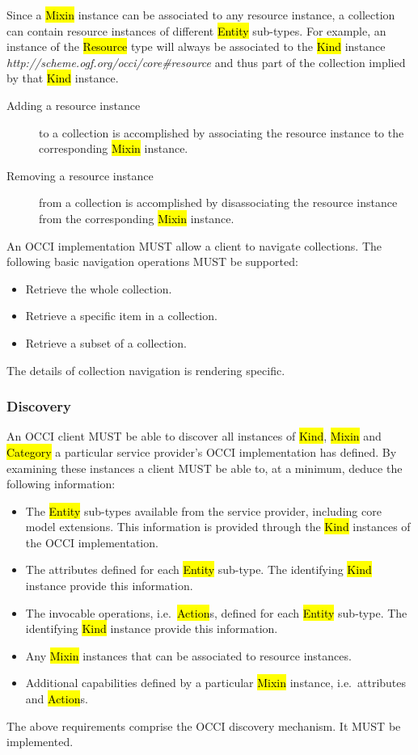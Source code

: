\documentclass[10pt,a4paper]{article}
\begin{document}
Since a \hl{Mixin} instance can be associated to any resource
instance, a collection can contain resource instances of different
\hl{Entity} sub-types.
For example, an instance of the \hl{Resource} type will always be
associated to the \hl{Kind} instance
\textit{http://scheme.ogf.org/occi/core\#resource} and thus part of
the collection implied by that \hl{Kind} instance.
%
\begin{description}
  \item[Adding a resource instance] to a collection is accomplished by
    associating the resource instance to the corresponding \hl{Mixin}
    instance.
  \item[Removing a resource instance] from a collection is
    accomplished by disassociating the resource instance from the
    corresponding \hl{Mixin} instance.
\end{description}
%
An OCCI implementation MUST allow a client to navigate
collections. The following basic navigation operations MUST be
supported:
%
\begin{itemize}
  \item Retrieve the whole collection.
  \item Retrieve a specific item in a collection.
  \item Retrieve a subset of a collection.
\end{itemize}
%
The details of collection navigation is rendering specific.

\subsubsection{Discovery}
\label{sec:discovery}
An OCCI client MUST be able to discover all instances of \hl{Kind},
\hl{Mixin} and \hl{Category} a particular service provider's OCCI
implementation has defined. By examining these instances a client MUST
be able to, at a minimum, deduce the following information:
%
\begin{itemize}
  \item The \hl{Entity} sub-types available from the service provider,
    including core model extensions. This information is provided
    through the \hl{Kind} instances of the OCCI implementation.
  \item The attributes defined for each \hl{Entity} sub-type. The
    identifying \hl{Kind} instance provide this information.
  \item The invocable operations, i.e.~\hl{Action}s, defined for each
    \hl{Entity} sub-type. The identifying \hl{Kind} instance provide
    this information.
  \item Any \hl{Mixin} instances that can be associated to resource
    instances.
  \item Additional capabilities defined by a particular \hl{Mixin}
    instance, i.e.~attributes and \hl{Action}s.
\end{itemize}
%
The above requirements comprise the OCCI discovery mechanism. It MUST
be implemented.
\end{document}
